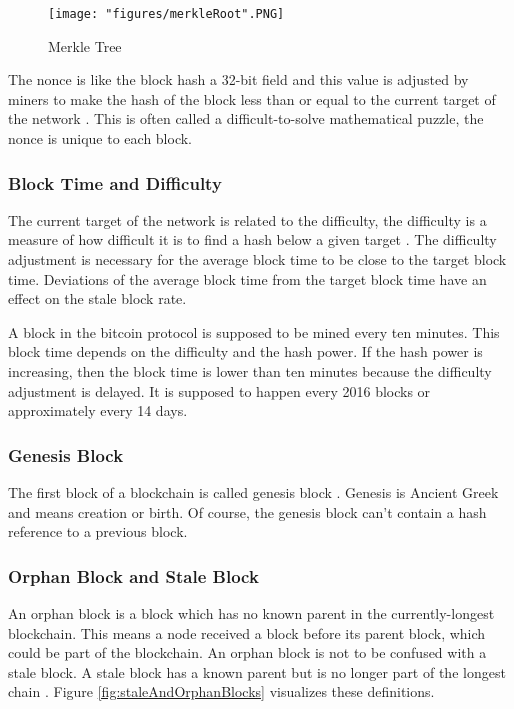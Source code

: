 \begin{figure}[!htb]
\centering
\texttt{[image: "figures/merkleRoot".PNG]}
\caption{Merkle Tree \cite{merkleRoot}
\label{fig:merkleRoot}}
\end{figure}

The nonce is like the block hash a 32-bit field and this value is adjusted by miners to make the hash of the block less than or equal to the current target of the network \cite{nonce}. This is often called a difficult-to-solve mathematical puzzle, the nonce is unique to each block. 

\subsubsection{Block Time and Difficulty}
The current target of the network is related to the difficulty, the difficulty is a measure of how difficult it is to find a hash below a given target \cite{target}. The difficulty adjustment is necessary for the average block time to be close to the target block time. Deviations of the average block time from the target block time have an effect on the stale block rate.

A block in the bitcoin protocol is supposed to be mined every ten minutes. This block time depends on the difficulty and the hash power. If the hash power is increasing, then the block time is lower than ten minutes because the difficulty adjustment is delayed. It is supposed to happen every 2016 blocks or approximately every 14 days.

\subsubsection{Genesis Block}
The first block of a blockchain is called genesis block \cite{genesisBackground}. Genesis is Ancient Greek and means creation or birth. Of course, the genesis block can't contain a hash reference to a previous block.

\subsubsection{Orphan Block and Stale Block}
An orphan block is a block which has no known parent in the currently-longest blockchain. This means a node received a block before its parent block, which could be part of the blockchain. An orphan block is not to be confused with a stale block. A stale block has a known parent but is no longer part of the longest chain \citep{vocabulary}. Figure \ref{fig:staleAndOrphanBlocks} visualizes these definitions.

